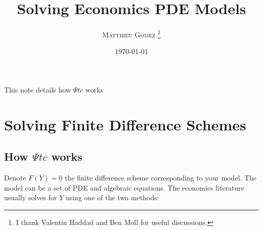 \documentclass[english]{article}
\begin{document}
\title{Solving Economics PDE Models}
\author{\large{\textsc{Matthieu Gomez \thanks{I thank Valentin Haddad and Ben Moll for useful discussions.}}}}
\date{\today}
\maketitle
This note details how $\Psi tc$ works

\section{Solving Finite Difference Schemes}

\subsection{How $\Psi tc$ works}

Denote $F(Y) = 0$ the finite difference scheme corresponding to your model. The model can be a set of PDE and algebraic equations.  The economics literature usually solves for $Y$ using one of the two methods:
\end{document}
